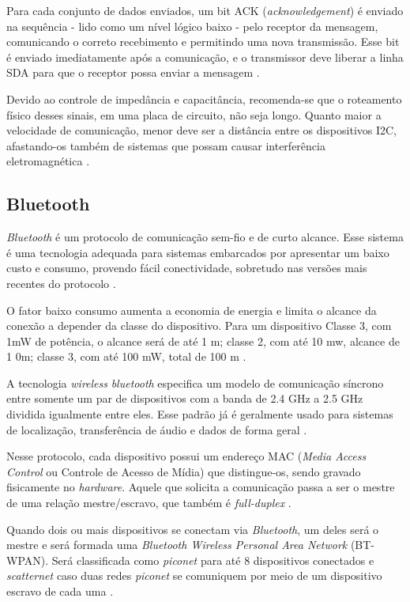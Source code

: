Para cada conjunto de dados enviados, um bit ACK (\textit{acknowledgement}) é enviado na sequência - lido como um nível lógico baixo - pelo receptor da mensagem, comunicando o correto recebimento e permitindo uma nova transmissão. Esse bit é enviado imediatamente após a comunicação, e o transmissor deve liberar a linha SDA para que o receptor possa enviar a mensagem \cite{man:texasI2C}. 

Devido ao controle de impedância e capacitância, recomenda-se que o roteamento físico desses sinais, em uma placa de circuito, não seja longo. Quanto maior a velocidade de comunicação, menor deve ser a distância entre os dispositivos I2C, afastando-os também de sistemas que possam causar interferência eletromagnética \cite{site:altiumpcb}.

\subsection{Bluetooth}

\textit{Bluetooth} é um protocolo de comunicação sem-fio e de curto alcance. Esse sistema é uma tecnologia adequada para sistemas embarcados por apresentar um baixo custo e consumo, provendo fácil conectividade, sobretudo nas versões mais recentes do protocolo \cite{diss:ClaudioBluetooth}. 

O fator baixo consumo aumenta a economia de energia e limita o alcance da conexão a depender da classe do dispositivo. Para um dispositivo Classe 3, com 1mW de potência, o alcance será de até 1 m; classe 2, com até 10 mw, alcance de 1 0m; classe 3, com até 100 mW, total de 100 m \cite{tcc:tier2019}.

A tecnologia \textit{wireless} \textit{bluetooth} especifica um modelo de comunicação síncrono entre somente um par de dispositivos com a banda de 2.4 GHz a 2.5 GHz dividida igualmente entre eles. Esse padrão já é geralmente usado para sistemas de localização, transferência de áudio e dados de forma geral \cite{book:BluetoothDemystified}.

Nesse protocolo, cada dispositivo possui um endereço MAC (\textit{Media Access Control} ou Controle de Acesso de Mídia) que distingue-os, sendo gravado fisicamente no \textit{hardware}. Aquele que solicita a comunicação passa a ser o mestre de uma relação mestre/escravo, que também é \textit{full-duplex} \cite{diss:ClaudioBluetooth}. 

Quando dois ou mais dispositivos se conectam via \textit{Bluetooth}, um deles será o mestre e será formada uma \textit{Bluetooth Wireless Personal Area Network} (BT-WPAN). Será classificada como \textit{piconet} para até 8 dispositivos conectados e \textit{scatternet} caso duas redes \textit{piconet} se comuniquem por meio de um dispositivo escravo de cada uma \cite{tcc:tier2019}. 

